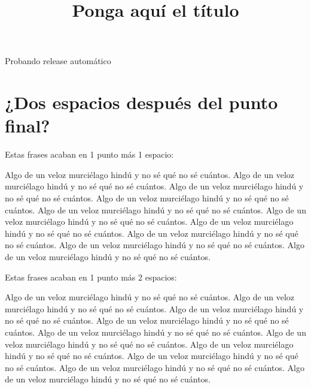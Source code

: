 \documentclass[a4paper, 11pt]{article}
\title{Ponga aquí el título}
\begin{document}
Probando release automático




\newpage
\section{¿Dos espacios después del punto final?}

\noindent
Estas frases acaban en 1 punto más 1 espacio:

Algo de un veloz murciélago hindú y no sé qué no sé cuántos. Algo de un veloz murciélago hindú y no sé qué no sé cuántos. Algo de un veloz murciélago hindú y no sé qué no sé cuántos. Algo de un veloz murciélago hindú y no sé qué no sé cuántos. Algo de un veloz murciélago hindú y no sé qué no sé cuántos. Algo de un veloz murciélago hindú y no sé qué no sé cuántos. Algo de un veloz murciélago hindú y no sé qué no sé cuántos. Algo de un veloz murciélago hindú y no sé qué no sé cuántos. Algo de un veloz murciélago hindú y no sé qué no sé cuántos. Algo de un veloz murciélago hindú y no sé qué no sé cuántos.

\smallskip
\noindent
Estas frases acaban en 1 punto más 2 espacios:

Algo de un veloz murciélago hindú y no sé qué no sé cuántos.  Algo de un veloz murciélago hindú y no sé qué no sé cuántos.  Algo de un veloz murciélago hindú y no sé qué no sé cuántos.  Algo de un veloz murciélago hindú y no sé qué no sé cuántos.  Algo de un veloz murciélago hindú y no sé qué no sé cuántos.  Algo de un veloz murciélago hindú y no sé qué no sé cuántos.  Algo de un veloz murciélago hindú y no sé qué no sé cuántos.  Algo de un veloz murciélago hindú y no sé qué no sé cuántos.  Algo de un veloz murciélago hindú y no sé qué no sé cuántos.  Algo de un veloz murciélago hindú y no sé qué no sé cuántos.
\end{document}
